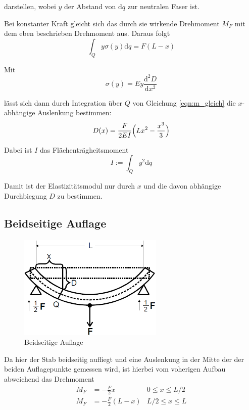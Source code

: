 darstellen, wobei $y$ der Abstand von $\text{d}q$ zur neutralen Faser ist.

Bei konstanter Kraft gleicht sich das durch sie wirkende Drehmoment $M_F$ mit dem eben beschrieben Drehmoment aus. Daraus folgt \begin{equation}
    \label{eqn:m_gleich}
    \int_Q y\sigma(y)\text{d}q = F (L - x) 
\end{equation}

Mit \begin{equation}
    \sigma (y) = E y \frac{\text{d}^2 D}{\text{d} x^2}
\end{equation}

lässt sich dann durch Integration über $Q$ von Gleichung \ref{eqn:m_gleich} die $x$- abhängige Auslenkung bestimmen:
\begin{equation}
    D(x) = \frac{F}{2EI} \Bigl( L x^2 - \frac{x^3}3 \Bigr)
\end{equation}

Dabei ist $I$ das Flächenträgheitsmoment \begin{equation}
    I := \int_Q y^2 \text{d}q
\end{equation}

Damit ist der Elastizitätsmodul nur durch $x$ und die davon abhängige Durchbiegung $D$ zu bestimmen.

\subsection{Beidseitige Auflage}
\begin{figure}
    \centering
    \includegraphics[height=5cm]{data/bild_2}
    \caption{Beidseitige Auflage}
\end{figure}

\FloatBarrier

Da hier der Stab beidseitig aufliegt und eine Auslenkung in der Mitte der der beiden Auflagepunkte gemessen wird, ist hierbei
vom voherigen Aufbau abweichend das Drehmoment \begin{align}
M_F &= - \frac{F}2 x       &   0 \leq x \leq L/2 \\
M_F &= - \frac{F}2 (L - x) & L/2 \leq x \leq L
\end{align}

